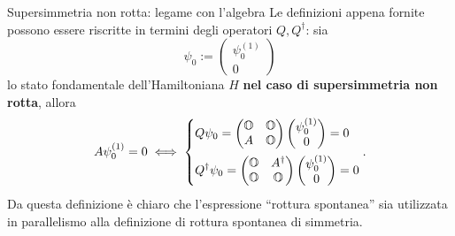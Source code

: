 \documentclass[11pt,aspectratio=169,handout]{beamer}
\begin{document}
\begin{frame}{Supersimmetria non rotta: legame con l'algebra}
    Le definizioni appena fornite possono essere riscritte in termini
    degli operatori $Q,Q^\dagger$: sia
    $$\psi_0:=\begin{pmatrix}
        \psi_0^{(1)}\\0
    \end{pmatrix}
    $$
    lo stato fondamentale dell'Hamiltoniana $H$ \textbf{nel caso di
    supersimmetria non rotta}, allora
    $$
    A\psi^{(1)}_0 = 0
    \iff
    \begin{dcases}
        Q\psi_0 = \begin{pmatrix}
            \mathbb{O}&\mathbb{O}\\
            A&\mathbb{O}
            \end{pmatrix}\begin{pmatrix}
            \psi^{(1)}_0\\ 0
        \end{pmatrix} = 0 \\
        Q^\dagger\psi_0 = \begin{pmatrix}
            \mathbb{O}&A^\dagger\\
            \mathbb{O}&\mathbb{O}
            \end{pmatrix}\begin{pmatrix}
            \psi^{(1)}_0\\ 0
        \end{pmatrix} = 0
    \end{dcases}.
    $$
    Da questa definizione è chiaro che l'espressione
    ``rottura spontanea'' sia utilizzata in parallelismo alla definizione di
    rottura spontanea di simmetria.
\end{frame}
\end{document}
